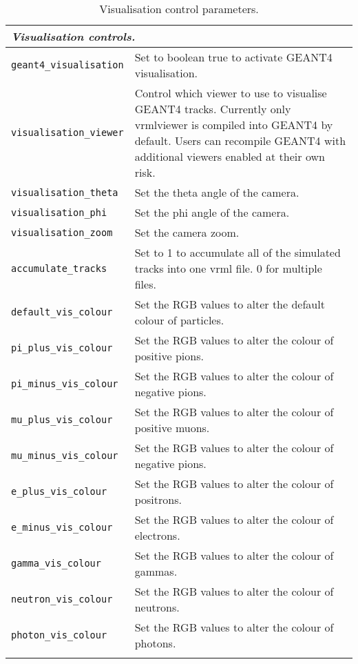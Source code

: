 \begin{table*}
\begin{center}
\caption{Visualisation control parameters.}
\begin{tabularx}{\textwidth}{lX}
\hline
\multicolumn{2}{l}{\emph{Visualisation controls.}} \\
\hline
\verb|geant4_visualisation| & Set to boolean true to activate GEANT4 visualisation.\\
\verb|visualisation_viewer| & Control which viewer to use to visualise GEANT4 tracks. Currently only vrmlviewer is compiled into GEANT4 by default. Users can recompile GEANT4 with additional viewers enabled at their own risk.\\
\verb|visualisation_theta| & Set the theta angle of the camera.\\
\verb|visualisation_phi| & Set the phi angle of the camera.\\
\verb|visualisation_zoom| & Set the camera zoom.\\
\verb|accumulate_tracks| & Set to 1 to accumulate all of the simulated tracks into one vrml file. 0 for multiple files.\\
\verb|default_vis_colour| & Set the RGB values to alter the default colour of particles.\\
\verb|pi_plus_vis_colour| & Set the RGB values to alter the colour of positive pions.\\
\verb|pi_minus_vis_colour| & Set the RGB values to alter the colour of negative pions.\\
\verb|mu_plus_vis_colour| & Set the RGB values to alter the colour of positive muons.\\
\verb|mu_minus_vis_colour| & Set the RGB values to alter the colour of negative pions.\\
\verb|e_plus_vis_colour| & Set the RGB values to alter the colour of positrons.\\
\verb|e_minus_vis_colour| & Set the RGB values to alter the colour of electrons.\\
\verb|gamma_vis_colour| & Set the RGB values to alter the colour of gammas.\\
\verb|neutron_vis_colour| & Set the RGB values to alter the colour of neutrons.\\
\verb|photon_vis_colour| & Set the RGB values to alter the colour of photons.\\
\begin{makeimage} %
\end{makeimage} 
\end{tabularx}
\end{center}
\end{table*}


